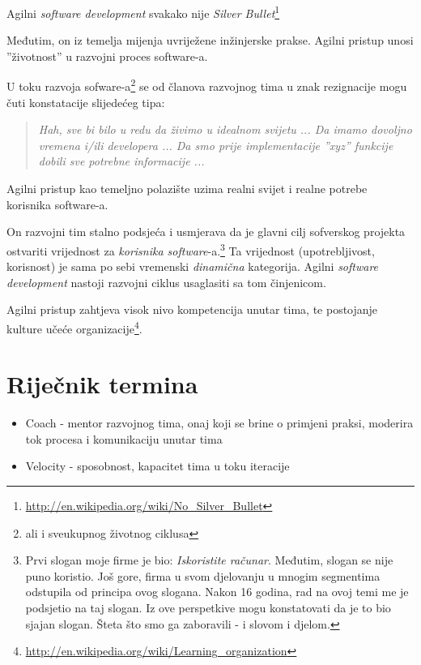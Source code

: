 \documentclass[lmodern, utf8, zavrsni]{fit}
\begin{document}
Agilni \emph{software development} svakako nije \emph{Silver Bullet}\footnote{\url{http://en.wikipedia.org/wiki/No_Silver_Bullet}}

Međutim, on iz temelja mijenja uvriježene inžinjerske prakse. Agilni pristup unosi ''životnost'' u razvojni proces software-a.

U toku razvoja sofware-a\footnote{ali i sveukupnog životnog ciklusa} se od članova razvojnog tima u znak rezignacije mogu čuti konstatacije slijedećeg tipa:
\begin{quotation}
  \emph{Hah, sve bi bilo u redu da živimo u idealnom svijetu ... Da imamo dovoljno vremena i/ili developera ... Da smo prije implementacije ''xyz'' funkcije dobili sve potrebne informacije ...}
\end{quotation}

Agilni pristup kao temeljno polazište uzima realni svijet i realne potrebe korisnika software-a.

On razvojni tim stalno podsjeća i usmjerava da je glavni cilj sofverskog projekta ostvariti vrijednost za \emph{korisnika software}-a.\footnote{Prvi slogan moje firme je bio: \emph{Iskoristite računar}. Međutim, slogan se nije puno koristio. Još gore, firma u svom djelovanju u mnogim segmentima odstupila od principa ovog slogana. Nakon 16 godina, rad na ovoj temi me je podsjetio na taj slogan. Iz ove perspetkive mogu konstatovati da je to bio sjajan slogan. Šteta što smo ga zaboravili - i slovom i djelom.}
Ta vrijednost (upotrebljivost, korisnost) je sama po sebi vremenski \emph{dinamična} kategorija. Agilni \emph{software development} nastoji razvojni ciklus usaglasiti sa tom činjenicom.

Agilni pristup zahtjeva visok nivo kompetencija unutar tima, te postojanje kulture učeće organizacije\footnote{\url{http://en.wikipedia.org/wiki/Learning_organization}}.





\appendix

\chapter{Riječnik termina}

\begin{itemize}
  \item Coach - mentor razvojnog tima, onaj koji se brine o primjeni praksi, moderira tok procesa i komunikaciju unutar tima
  \item Velocity - sposobnost, kapacitet tima u toku iteracije
\end{itemize}
\end{document}
